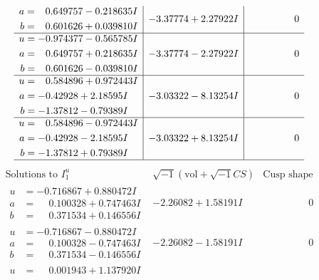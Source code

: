 \documentclass[1p]{elsarticle_modified}
\theoremstyle{definition}
\newcommand{\I}{\sqrt{-1}}
\begin{document}
$$\begin{array}{c|c|c}
\begin{aligned}
a &= \phantom{-}0.649757 - 0.218635 I \\
b &= \phantom{-}0.601626 + 0.039810 I\end{aligned}
 & -3.37774 + 2.27922 I & \phantom{-0.000000 } 0 \\ \hline\begin{aligned}
u &= -0.974377 - 0.565785 I \\
a &= \phantom{-}0.649757 + 0.218635 I \\
b &= \phantom{-}0.601626 - 0.039810 I\end{aligned}
 & -3.37774 - 2.27922 I & \phantom{-0.000000 } 0 \\ \hline\begin{aligned}
u &= \phantom{-}0.584896 + 0.972443 I \\
a &= -0.42928 + 2.18595 I \\
b &= -1.37812 - 0.79389 I\end{aligned}
 & -3.03322 - 8.13254 I & \phantom{-0.000000 } 0 \\ \hline\begin{aligned}
u &= \phantom{-}0.584896 - 0.972443 I \\
a &= -0.42928 - 2.18595 I \\
b &= -1.37812 + 0.79389 I\end{aligned}
 & -3.03322 + 8.13254 I & \phantom{-0.000000 } 0\\
 \hline 
 \end{array}$$\newpage$$\begin{array}{c|c|c}  
\text{Solutions to }I^u_{1}& \I (\text{vol} + \sqrt{-1}CS) & \text{Cusp shape}\\
 \hline 
\begin{aligned}
u &= -0.716867 + 0.880472 I \\
a &= \phantom{-}0.100328 + 0.747463 I \\
b &= \phantom{-}0.371534 + 0.146556 I\end{aligned}
 & -2.26082 + 1.58191 I & \phantom{-0.000000 } 0 \\ \hline\begin{aligned}
u &= -0.716867 - 0.880472 I \\
a &= \phantom{-}0.100328 - 0.747463 I \\
b &= \phantom{-}0.371534 - 0.146556 I\end{aligned}
 & -2.26082 - 1.58191 I & \phantom{-0.000000 } 0 \\ \hline\begin{aligned}
u &= \phantom{-}0.001943 + 1.137920 I \\

\end{aligned}
\end{array}$$
\end{document}
